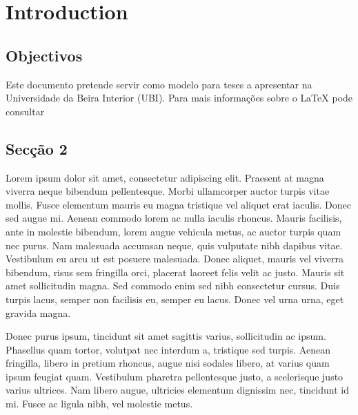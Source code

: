 \chapter{Introduction}
\label{chap:int}





\section{Objectivos}
Este documento pretende servir como modelo para teses a apresentar na Universidade da Beira Interior (UBI). Para mais informações sobre o {\LaTeX} pode consultar %

\section{Secção 2}
\label{sec2}
Lorem ipsum dolor sit amet, consectetur adipiscing elit. Praesent at magna viverra neque bibendum pellentesque. Morbi ullamcorper auctor turpis vitae mollis. Fusce elementum mauris eu magna tristique vel aliquet erat iaculis. Donec sed augue mi. Aenean commodo lorem ac nulla iaculis rhoncus. Mauris facilisis, ante in molestie bibendum, lorem augue vehicula metus, ac auctor turpis quam nec purus. Nam malesuada accumsan neque, quis vulputate nibh dapibus vitae. Vestibulum eu arcu ut est posuere malesuada. Donec aliquet, mauris vel viverra bibendum, risus sem fringilla orci, placerat laoreet felis velit ac justo. Mauris sit amet sollicitudin magna. Sed commodo enim sed nibh consectetur cursus. Duis turpis lacus, semper non facilisis eu, semper eu lacus. Donec vel urna urna, eget gravida magna.

Donec purus ipsum, tincidunt sit amet sagittis varius, sollicitudin ac ipsum. Phasellus quam tortor, volutpat nec interdum a, tristique sed turpis. Aenean fringilla, libero in pretium rhoncus, augue nisi sodales libero, at varius quam ipsum feugiat quam. Vestibulum pharetra pellentesque justo, a scelerisque justo varius ultrices. Nam libero augue, ultricies elementum dignissim nec, tincidunt id mi. Fusce ac ligula nibh, vel molestie metus. 

